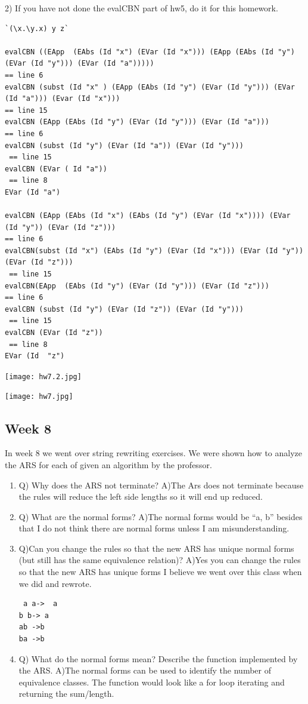 \documentclass{article}
\theoremstyle{theorem}
\theoremstyle{definition}
\theoremstyle{remark}
\begin{document}
2) If you have not done the evalCBN part of hw5, do it for this homework.
\begin{lstlisting}
`(\x.\y.x) y z`

evalCBN ((EApp  (EAbs (Id "x") (EVar (Id "x"))) (EApp (EAbs (Id "y") (EVar (Id "y"))) (EVar (Id "a")))))
== line 6
evalCBN (subst (Id "x" ) (EApp (EAbs (Id "y") (EVar (Id "y"))) (EVar (Id "a"))) (Evar (Id "x"))) 
== line 15
evalCBN (EApp (EAbs (Id "y") (EVar (Id "y"))) (EVar (Id "a")))
== line 6
evalCBN (subst (Id "y") (EVar (Id "a")) (EVar (Id "y")))
 == line 15
evalCBN (EVar ( Id "a"))
 == line 8
EVar (Id "a")

evalCBN (EApp (EAbs (Id "x") (EAbs (Id "y") (EVar (Id "x")))) (EVar (Id "y")) (EVar (Id "z"))) 
== line 6
evalCBN(subst (Id "x") (EAbs (Id "y") (EVar (Id "x"))) (EVar (Id "y")) (EVar (Id "z")))
 == line 15
evalCBN(EApp  (EAbs (Id "y") (EVar (Id "y"))) (EVar (Id "z")))
== line 6
evalCBN (subst (Id "y") (EVar (Id "z")) (EVar (Id "y")))
 == line 15
evalCBN (EVar (Id "z")) 
 == line 8
EVar (Id  "z")
\end{lstlisting}


\texttt{[image: hw7.2.jpg]}
\item \texttt{[image: hw7.jpg]}
\subsection{Week 8}
 In week 8 we went over string rewriting exercises. We were shown how to analyze the ARS for each of given an algorithm by the professor.   
 \begin{enumerate}
\item Q) Why does the ARS not terminate?  A)The Ars does not terminate because the rules will reduce the left side lengths so it will end up reduced. 
\item Q) What are the normal forms? A)The normal forms would be “a, b” besides that I do not think there are normal forms unless I am misunderstanding.
\item Q)Can you change the rules so that the new ARS has unique normal forms (but still has the same equivalence relation)? A)Yes you can change the rules so that the new ARS has unique forms I believe we went over this class when we did and rewrote.  \begin{lstlisting} a a->  a
b b-> a
ab ->b
ba ->b \end{lstlisting}
\item Q) What do the normal forms mean? Describe the function implemented by the ARS. A)The normal forms can be used to identify the number of equivalence classes. The function would look like a for loop iterating and returning the sum/length.

   \end{enumerate}
\end{document}
